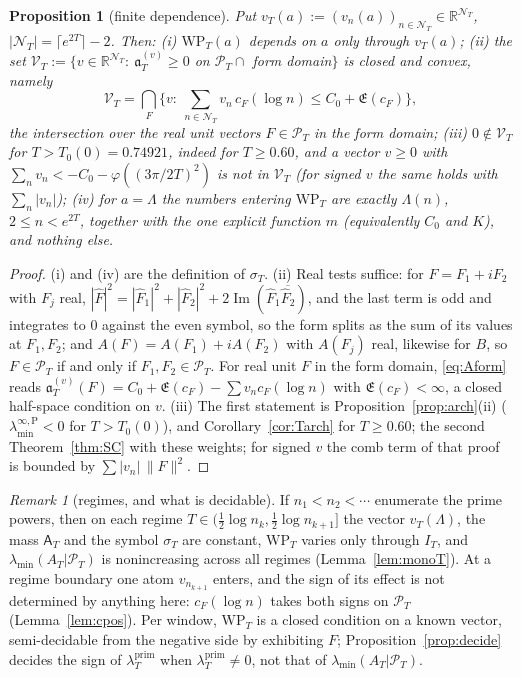 \documentclass[11pt]{amsart}
\newtheorem{proposition}[theorem]{Proposition}
\theoremstyle{definition}
\theoremstyle{remark}
\newtheorem{remark}[theorem]{Remark}
\newcommand{\R}{\mathbb R}
\newcommand{\Iml}{\operatorname{Im}}
\newcommand{\PT}{\mathcal P_T}
\newcommand{\IT}{I_T}
\newcommand{\lamP}{\lambda^{\mathrm{prim}}_T}
\newcommand{\lamA}{\lambda_{\min}(A_T|\PT)}
\newcommand{\sT}{\sigma_T}
\newcommand{\Fh}{\widehat F}
\newcommand{\cF}{c_F}
\newcommand{\Lev}{\mathfrak E}
\newcommand{\NT}{\mathcal N_T}
\newcommand{\Aconst}{\mathsf A_T}
\newcommand{\laminfP}{\lambda^{\infty,\mathrm P}_{\min}}
\begin{document}
\begin{proposition}[finite dependence]\label{prop:finite}
Put $v_T(a):=(v_n(a))_{n\in\NT}\in\R^{\NT}$, $|\NT|=\lceil e^{2T}\rceil-2$. Then:
\emph{(i)} $\mathrm{WP}_T(a)$ depends on $a$ only through $v_T(a)$;
\emph{(ii)} the set $\mathcal V_T:=\{v\in\R^{\NT}:\ \mathfrak a^{(v)}_T\ge0$ on $\PT\cap$ form domain$\}$ is closed
and convex, namely
\[
\mathcal V_T=\bigcap_{F}\Big\{v:\ \sum_{n\in\NT}v_n\,\cF(\log n)\le C_0+\Lev(\cF)\Big\},
\]
the intersection over the real unit vectors $F\in\PT$ in the form domain;
\emph{(iii)} $0\notin\mathcal V_T$ for $T>T_0(0)=0.74921$, indeed for $T\ge0.60$, and a vector $v\ge0$ with
$\sum_nv_n<-C_0-\varphi((3\pi/2T)^2)$ is not in $\mathcal V_T$ (for signed $v$ the same holds with
$\sum_n|v_n|$);
\emph{(iv)} for $a=\Lambda$ the numbers entering $\mathrm{WP}_T$ are exactly $\Lambda(n)$, $2\le n<e^{2T}$,
together with the one explicit function $m$ (equivalently $C_0$ and $K$), and nothing else.
\end{proposition}
\begin{proof}
(i) and (iv) are the definition of $\sT$. (ii) Real tests suffice: for $F=F_1+iF_2$ with $F_j$ real,
$|\Fh|^2=|\Fh_1|^2+|\Fh_2|^2+2\Iml(\Fh_1\overline{\Fh_2})$, and the last term is odd and integrates to $0$
against the even symbol, so the form splits as the sum of its values at $F_1,F_2$; and $A(F)=A(F_1)+iA(F_2)$
with $A(F_j)$ real, likewise for $B$, so $F\in\PT$ if and only if $F_1,F_2\in\PT$. For real unit $F$ in the
form domain, \eqref{eq:Aform} reads $\mathfrak a^{(v)}_T(F)=C_0+\Lev(\cF)-\sum v_n\cF(\log n)$ with
$\Lev(\cF)<\infty$, a closed half-space condition on $v$. (iii) The first statement is
Proposition~\ref{prop:arch}(ii) ($\laminfP<0$ for $T>T_0(0)$), and Corollary~\ref{cor:Tarch} for $T\ge0.60$; the second Theorem~\ref{thm:SC} with these
weights; for signed $v$ the comb term of that proof is bounded by $\sum|v_n|\,\|F\|^2$.
\end{proof}

\begin{remark}[regimes, and what is decidable]\label{rem:regimes}
If $n_1<n_2<\cdots$ enumerate the prime powers, then on each regime $T\in(\frac12\log n_k,\frac12\log n_{k+1}]$
the vector $v_T(\Lambda)$, the mass $\Aconst$ and the symbol $\sT$ are constant, $\mathrm{WP}_T$ varies only
through $\IT$, and $\lamA$ is nonincreasing across all regimes (Lemma~\ref{lem:monoT}). At a regime
boundary one atom $v_{n_{k+1}}$ enters, and the sign of its effect is not determined by anything here:
$\cF(\log n)$ takes both signs on $\PT$ (Lemma~\ref{lem:cpos}). Per window, $\mathrm{WP}_T$ is a closed
condition on a known vector, semi-decidable from the negative side by exhibiting $F$;
Proposition~\ref{prop:decide} decides the sign of $\lamP$ when $\lamP\ne0$, not that of $\lamA$.
\end{remark}
\end{document}

